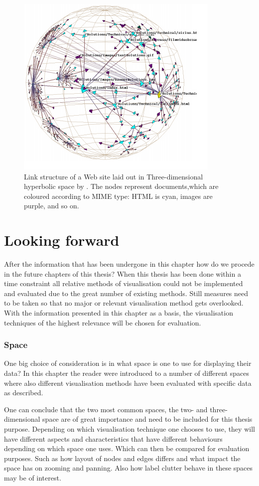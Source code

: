 \documentclass[a4paper,11pt]{kth-mag}
\begin{document}
 \begin{figure}[!htbp]
	\centering
	\includegraphics[scale=0.5]{HyperBolicEx1}
	\caption{Link structure of a Web site laid out in Three-dimensional hyperbolic space by \cite{636718}. The nodes represent documents,which are coloured
according to MIME type: HTML is cyan, images are purple, and so on.}
	\label{fig:hyperbolic_example}
\end{figure}

\newpage
\section{Looking forward}
After the information that has been undergone in this chapter how do we procede in the future chapters of this thesis? 
When this thesis has been done within a time constraint all relative methods of visualisation could not be implemented and evaluated due to the great number of existing methods. Still measures need to be
taken so that no major or relevant visualisation method gets overlooked. With the information presented in this chapter as a basis, the visualisation techniques of the highest relevance will be
 chosen for evaluation.
\subsubsection{Space}
One big choice of consideration is in what space is one to use for displaying their data? In this chapter the reader were introduced to a number of different spaces where also different
 visualisation methods have been evaluated with specific data as described.

One can conclude that the two most common spaces, the two- and three-dimensional space are of great importance and need to be included for this thesis purpose. Depending on which visualisation 
technique one chooses to use, they will have different aspects and characteristics that have different behaviours depending on which space one uses. Which can then be compared for evaluation purposes.
Such as how layout of nodes and edges differs and what impact the space has on zooming and panning. Also how label clutter behave in these spaces may be of interest.
\end{document}
